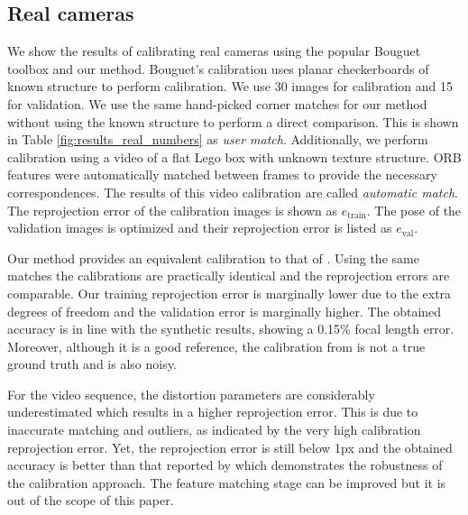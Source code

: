 \documentclass[10pt,twocolumn,letterpaper]{article}
\begin{document}
\subsection{Real cameras}
We show the results of calibrating real cameras using the popular Bouguet toolbox \cite{bouguetMCT} and our method. Bouguet's calibration uses planar checkerboards of known structure to perform calibration. We use 30 images for calibration and 15 for validation. We use the same hand-picked corner matches for our method without using the known structure to perform a direct comparison. This is shown in Table \ref{fig:results_real_numbers} as \emph{user match}. Additionally, we perform calibration using a video of a flat Lego box with unknown texture structure. ORB features \cite{rublee2011} were automatically matched between frames to provide the necessary correspondences. The results of this video calibration are called \emph{automatic match}. The reprojection error of the calibration images is shown as $e_\text{train}$. The pose of the validation images is optimized and their reprojection error is listed as $e_\text{val}$. 

Our method provides an equivalent calibration to that of \cite{bouguetMCT}. Using the same matches the calibrations are practically identical and the reprojection errors are comparable. Our training reprojection error is marginally lower due to the extra degrees of freedom and the validation error is marginally higher. The obtained accuracy is in line with the synthetic results, showing a 0.15\% focal length error. Moreover, although it is a good reference, the calibration from \cite{bouguetMCT} is not a true ground truth and is also noisy.

For the video sequence, the distortion parameters are considerably underestimated which results in a higher reprojection error. This is due to inaccurate matching and outliers, as indicated by the very high calibration reprojection error. Yet, the reprojection error is still below 1px and the obtained accuracy is better than that reported by \cite{gurdjos2003} which demonstrates the robustness of the calibration approach. The feature matching stage can be improved but it is out of the scope of this paper.
\end{document}
